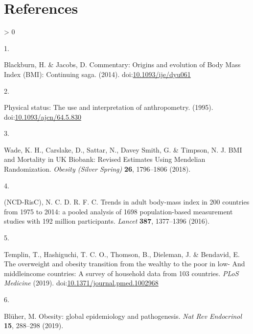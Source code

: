 \documentclass[11pt,twoside]{bristolthesis}
\newlength{\cslhangindent}
\newlength{\csllabelwidth}
\newenvironment{CSLReferences}[2] %
 {%
  \setlength{\parindent}{0pt}
  \ifodd #1 \everypar{\setlength{\hangindent}{\cslhangindent}}\ignorespaces\fi
  \ifnum #2 > 0
  \setlength{\parskip}{#2\baselineskip}
  \fi
 }%
 {}
\newcommand{\CSLLeftMargin}[1]{\parbox[t]{\csllabelwidth}{#1}}
\newcommand{\CSLRightInline}[1]{\parbox[t]{\linewidth - \csllabelwidth}{#1}\break}
\begin{document}
\hypertarget{references}{%
\chapter*{References}\label{references}}


\noindent

\setlength{\parindent}{-0.20in}
\setlength{\leftskip}{0.20in}
\setlength{\parskip}{8pt}

\hypertarget{refs}{}
\begin{CSLReferences}{0}{0}
\leavevmode\hypertarget{ref-Blackburn2014}{}%
\CSLLeftMargin{1. }
\CSLRightInline{Blackburn, H. \& Jacobs, D. {Commentary: Origins and evolution of Body Mass Index (BMI): Continuing saga}. (2014). doi:\href{https://doi.org/10.1093/ije/dyu061}{10.1093/ije/dyu061}}

\leavevmode\hypertarget{ref-WHO1995}{}%
\CSLLeftMargin{2. }
\CSLRightInline{{Physical status: The use and interpretation of anthropometry}. (1995). doi:\href{https://doi.org/10.1093/ajcn/64.5.830}{10.1093/ajcn/64.5.830}}

\leavevmode\hypertarget{ref-Wade2018}{}%
\CSLLeftMargin{3. }
\CSLRightInline{Wade, K. H., Carslake, D., Sattar, N., Davey Smith, G. \& Timpson, N. J. {BMI and Mortality in UK Biobank: Revised Estimates Using Mendelian Randomization}. \emph{Obesity (Silver Spring)} \textbf{26}, 1796--1806 (2018).}

\leavevmode\hypertarget{ref-NCD-RisC2016}{}%
\CSLLeftMargin{4. }
\CSLRightInline{(NCD-RisC), N. C. D. R. F. C. {Trends in adult body-mass index in 200 countries from 1975 to 2014: a pooled analysis of 1698 population-based measurement studies with 19{{}}2 million participants}. \emph{Lancet} \textbf{387}, 1377--1396 (2016).}

\leavevmode\hypertarget{ref-Templin2019}{}%
\CSLLeftMargin{5. }
\CSLRightInline{Templin, T., Hashiguchi, T. C. O., Thomson, B., Dieleman, J. \& Bendavid, E. {The overweight and obesity transition from the wealthy to the poor in low- And middleincome countries: A survey of household data from 103 countries}. \emph{PLoS Medicine} (2019). doi:\href{https://doi.org/10.1371/journal.pmed.1002968}{10.1371/journal.pmed.1002968}}

\leavevmode\hypertarget{ref-Bluher2019}{}%
\CSLLeftMargin{6. }
\CSLRightInline{Blüher, M. {Obesity: global epidemiology and pathogenesis}. \emph{Nat Rev Endocrinol} \textbf{15}, 288--298 (2019).}


\end{CSLReferences}
\end{document}
